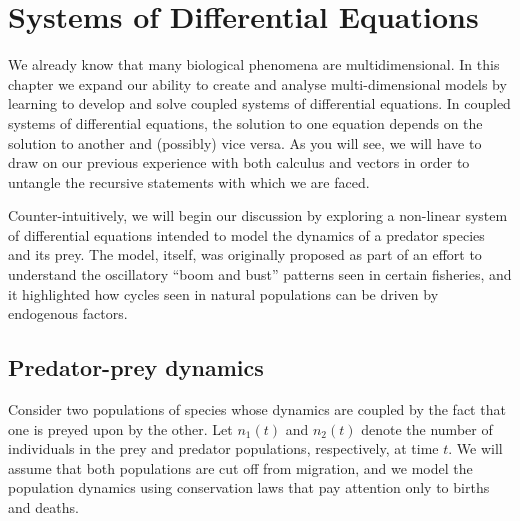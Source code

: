 \documentclass[../book.tex]{subfiles}
\begin{document}
\chapter{Systems of Differential Equations}\label{ch:sys}

We already know that many biological phenomena are multidimensional. In this chapter we expand our ability to create and analyse multi-dimensional models by learning to develop and solve coupled systems of differential equations. In coupled systems of differential equations, the solution to one equation depends on the solution to another and (possibly) vice versa. As you will see, we will have to draw on our previous experience with both calculus and vectors in order to untangle the recursive statements with which we are faced.

Counter-intuitively, we will begin our discussion by exploring a non-linear system of differential equations intended to model the dynamics of a predator species and its prey.  The model, itself, was originally proposed as part of an effort to understand the oscillatory ``boom and bust'' patterns seen in certain fisheries, and it highlighted how cycles seen in natural populations can be driven by endogenous factors.

\section{Predator-prey dynamics}

Consider two populations of species whose dynamics are coupled by the fact that one is preyed upon by the other. Let \(n_1(t)\) and \(n_2(t)\) denote the number of individuals in the prey and predator populations, respectively, at time \(t\). We will assume that both populations are cut off from migration, and we model the population dynamics using conservation laws that pay attention only to births and deaths.
\end{document}
